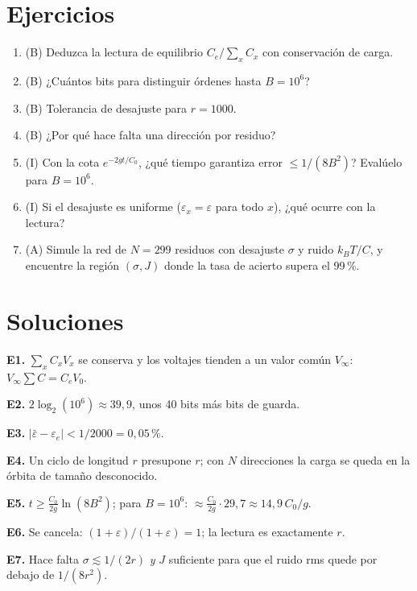\documentclass[11pt,a4paper]{article}
\begin{document}
\section{Ejercicios}
\begin{enumerate}[label=\textbf{E\arabic*.}]
\item (B) Deduzca la lectura de equilibrio $C_e/\sum_xC_x$ con conservación de carga.
\item (B) ¿Cuántos bits para distinguir órdenes hasta $B=10^6$?
\item (B) Tolerancia de desajuste para $r=1000$.
\item (B) ¿Por qué hace falta una dirección por residuo?
\item (I) Con la cota $e^{-2gt/C_0}$, ¿qué tiempo garantiza error $\le1/(8B^2)$? Evalúelo para $B=10^6$.
\item (I) Si el desajuste es uniforme ($\varepsilon_x=\varepsilon$ para todo $x$), ¿qué ocurre con la lectura?
\item (A) Simule la red de $N=299$ residuos con desajuste $\sigma$ y ruido $k_BT/C$, y encuentre la región $(\sigma,J)$ donde la tasa de acierto supera el 99\,\%.
\end{enumerate}
\section{Soluciones}
\begin{solucion}
\textbf{E1.} $\sum_xC_xV_x$ se conserva y los voltajes tienden a un valor común $V_\infty$: $V_\infty\sum C=C_eV_0$.

\textbf{E2.} $2\log_2(10^6)\approx39{,}9$, unos 40 bits más bits de guarda.

\textbf{E3.} $|\bar\varepsilon-\varepsilon_e|<1/2000=0{,}05\,\%$.

\textbf{E4.} Un ciclo de longitud $r$ presupone $r$; con $N$ direcciones la carga se queda en la órbita de tamaño desconocido.

\textbf{E5.} $t\ge\frac{C_0}{2g}\ln(8B^2)$; para $B=10^6$: $\approx\frac{C_0}{2g}\cdot29{,}7\approx14{,}9\,C_0/g$.

\textbf{E6.} Se cancela: $(1+\varepsilon)/(1+\varepsilon)=1$; la lectura es exactamente $r$.

\textbf{E7.} Hace falta $\sigma\lesssim1/(2r)$ \emph{y} $J$ suficiente para que el ruido rms quede por debajo de $1/(8r^2)$.
\end{solucion}
\end{document}
